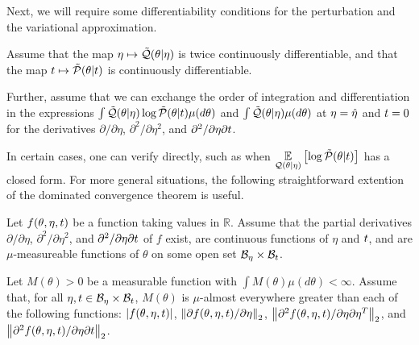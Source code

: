Next, we will require some differentiability conditions for the perturbation and
the variational approximation.

%
\begin{assu}
%
Assume that the map $\eta \mapsto \tilde{\mathcal{Q}}(\theta \vert \eta)$ is twice
continuously differentiable, and that the map $t \mapsto \tilde{\mathcal{P}}(\theta \vert
t)$ is continuously differentiable.

Further, assume that we can exchange the order of integration and
differentiation in the expressions $\int \tilde{\mathcal{Q}}(\theta \vert \eta) \log
\tilde{\mathcal{P}}(\theta \vert t) \mu(d\theta)$ and $\int \tilde{\mathcal{Q}}(\theta \vert \eta)
\mu(d\theta)$ at $\eta = \hat\eta$ and $t = 0$ for the derivatives $\partial /
\partial \eta$, $\partial^2 / \partial \eta^2$, and $\partial^2 / \partial \eta
\partial t$.
%
\end{assu}

In certain cases, one can verify  directly, such as when
$\underset{\mathcal{Q}(\theta \vert \eta)}{\mathbb{E}}\left[\log \tilde{\mathcal{P}}(\theta \vert t)\right]$ has a closed form.
For more general situations, the following straightforward extention of the
dominated convergence theorem \citep[Theorem 16.8]{billingsley:1986:probability}
is useful.

%
\begin{assu}
%
Let $f(\theta, \eta, t)$ be a function taking values in $\mathbb{R}$. Assume
that the partial derivatives $\partial / \partial \eta$, $\partial^2 / \partial
\eta^2$, and $\partial^2 / \partial \eta \partial t$ of $f$ exist, are
continuous functions of $\eta$ and $t$, and are $\mu$-measureable functions of
$\theta$ on some open set $\mathcal{B}_\eta \times \mathcal{B}_t$.

Let $M(\theta) > 0$ be a measurable function with $\int M(\theta) \mu(d\theta) <
\infty$.  Assume that, for all $\eta, t \in \mathcal{B}_\eta \times \mathcal{B}_t$,
$M(\theta)$ is $\mu$-almost everywhere greater than each of the following
functions: $\left|f(\theta, \eta, t)\right|$, $\left\Vert\partial f(\theta, \eta, t) /
\partial \eta\right\Vert_2$, $\left\Vert\partial^2 f(\theta, \eta, t) / \partial \eta
\partial \eta^T\right\Vert_2$, and $\left\Vert\partial^2 f(\theta, \eta, t) / \partial \eta
\partial t\right\Vert_2$.
%
\end{assu}
%

